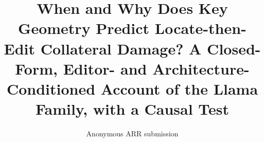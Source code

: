 \documentclass[11pt]{article}
\title{When and Why Does Key Geometry Predict Locate-then-Edit
Collateral Damage? A Closed-Form, Editor- and Architecture-Conditioned
Account of the Llama Family, with a Causal Test}
\author{Anonymous ARR submission}
\begin{document}
\maketitle

\begin{abstract}

\end{abstract}













\appendix

\end{document}
